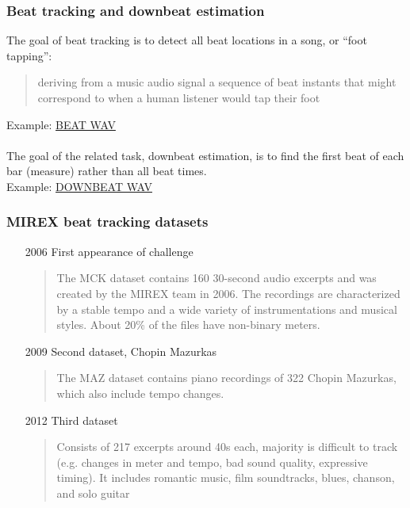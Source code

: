 \documentclass{beamer}
\begin{document}

\begin{frame}
	\frametitle{Beat tracking and downbeat estimation}
	The goal of beat tracking is to detect all beat locations in a song, or ``foot tapping'':
	\begin{quote}
	deriving from a music audio signal a sequence of beat instants that might correspond to when a human listener would tap their foot
	\end{quote}
	Example: \href{run:./beat_clicks.wav}{BEAT WAV}\ \\\ \\
	The goal of the related task, downbeat estimation, is to find the first beat of each bar (measure) rather than all beat times. \ \\
	Example: \href{run:./downbeat_clicks.wav}{DOWNBEAT WAV}
\end{frame}

\begin{frame}
	\frametitle{MIREX beat tracking datasets}
	\begin{enumerate}
		\item[2006]
			First appearance of challenge 
			\begin{quote}
			The MCK dataset contains 160 30-second audio excerpts and was created by the MIREX team in 2006. The recordings are characterized by a stable tempo and a wide variety of instrumentations and musical styles.  About 20\% of the files have non-binary meters.
			\end{quote}
		\item[2009]
			Second dataset, Chopin Mazurkas
			\begin{quote}
			The MAZ dataset contains piano recordings of 322 Chopin Mazurkas, which also include tempo changes.
			\end{quote}
		\item[2012]
			Third dataset 
			\begin{quote}
			Consists of 217 excerpts around 40s each, majority is difficult to track (e.g. changes in meter and tempo, bad sound quality, expressive timing). It includes romantic music, film soundtracks, blues, chanson, and solo guitar
			\end{quote}
	\end{enumerate}
\end{frame}
\end{document}
